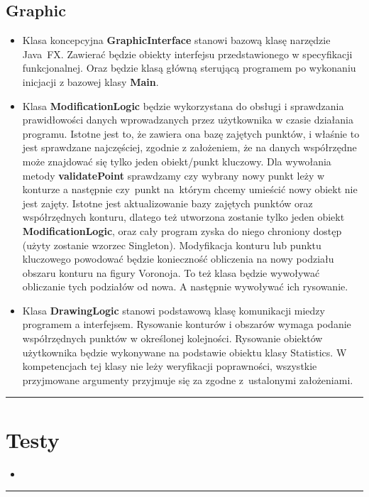 \documentclass[a4paper,11pt]{article}
\newcommand{\linia}{\rule{\linewidth}{0.4mm}}
\begin{document}
\subsection{Graphic}
\begin{itemize}
\item Klasa koncepcyjna \textbf{GraphicInterface} stanowi bazową klasę narzędzie Java~FX. Zawierać będzie obiekty interfejsu przedstawionego w specyfikacji funkcjonalnej. Oraz będzie klasą główną sterującą programem po wykonaniu inicjacji z bazowej klasy \textbf{Main}.
\item Klasa \textbf{ModificationLogic} będzie wykorzystana do obsługi i sprawdzania prawidłowości danych wprowadzanych przez użytkownika w czasie działania programu. Istotne jest to, że zawiera ona bazę zajętych punktów, i właśnie to jest sprawdzane najczęściej, zgodnie z założeniem, że na danych współrzędne może znajdować się tylko jeden obiekt/punkt kluczowy. Dla wywołania metody \textbf{validatePoint} sprawdzamy czy wybrany nowy punkt leży w konturze a następnie czy~punkt na~którym chcemy umieścić nowy obiekt nie jest zajęty. Istotne jest aktualizowanie bazy zajętych punktów oraz współrzędnych konturu, dlatego też utworzona zostanie tylko jeden obiekt \textbf{ModificationLogic}, oraz cały program zyska do niego chroniony dostęp (użyty zostanie wzorzec Singleton). Modyfikacja konturu lub punktu kluczowego powodować będzie konieczność obliczenia na nowy podziału obszaru konturu na figury Voronoja. To też klasa będzie wywoływać obliczanie tych podziałów od nowa. A następnie wywoływać ich rysowanie.
\item Klasa \textbf{DrawingLogic} stanowi podstawową klasę komunikacji miedzy programem a interfejsem. Rysowanie konturów i obszarów wymaga podanie współrzędnych punktów w określonej kolejności. Rysowanie obiektów użytkownika będzie wykonywane na podstawie obiektu klasy Statistics. W kompetencjach tej klasy nie leży weryfikacji poprawności, wszystkie przyjmowane argumenty przyjmuje się za zgodne z~ustalonymi założeniami. 
\end{itemize}

\noindent\linia

\section{Testy}
\begin{itemize}
\item 
\end{itemize}

\noindent\linia
\end{document}
